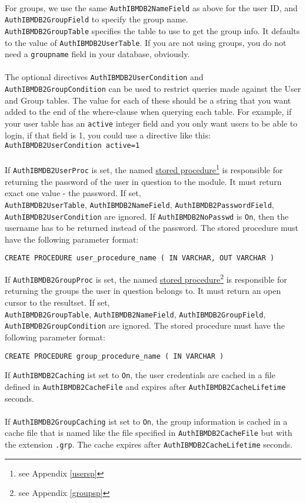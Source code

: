 \documentclass[11pt,a4paper]{article}
\begin{document}
\\
For groups, we use the same {\tt AuthIBMDB2NameField} as above for the user ID, and {\tt AuthIBMDB2GroupField} to specify the group name.\\ {\tt AuthIBMDB2GroupTable} specifies the table to use to get the group info.  It defaults to the value of {\tt AuthIBMDB2UserTable}.  If you are not using groups, you do not need a {\tt groupname} field in your database, obviously.\\
\\
The optional directives {\tt AuthIBMDB2UserCondition} and \\{\tt AuthIBMDB2GroupCondition} can be used to restrict queries made against the User and Group tables. The value for each of these should be a string that you want added to the end of the where-clause when querying each table.
For example, if your user table has an {\tt active} integer field and you only want users to be able to login, if that field is 1, you could use a directive like this:\\
{\tt AuthIBMDB2UserCondition active=1}\\
\\
If {\tt AuthIBMDB2UserProc} is set, the named \hyperlink{husersp}{stored procedure}\footnote{see Appendix \ref{usersp}} is responsible for returning the password of the user in question to the module. It must return exact one value - the password. If set,\\ {\tt AuthIBMDB2UserTable}, {\tt AuthIBMDB2NameField}, {\tt AuthIBMDB2PasswordField}, {\tt AuthIBMDB2UserCondition} are ignored. If {\tt AuthIBMDB2NoPasswd} is {\tt On}, then the username has to be returned instead of the password. The stored procedure must have the following parameter format:
\begin{verbatim}
CREATE PROCEDURE user_procedure_name ( IN VARCHAR, OUT VARCHAR )
\end{verbatim}
\pagebreak
If {\tt AuthIBMDB2GroupProc} is set, the named \hyperlink{hgroupsp}{stored procedure}\footnote{see Appendix \ref{groupsp}} is responsible for returning the groups the user in question belongs to. It must return an open cursor to the resultset. If set,\\ {\tt AuthIBMDB2GroupTable}, {\tt AuthIBMDB2NameField}, {\tt AuthIBMDB2GroupField}, {\tt AuthIBMDB2GroupCondition} are ignored. The stored procedure must have the following parameter format:
\begin{verbatim}
CREATE PROCEDURE group_procedure_name ( IN VARCHAR )
\end{verbatim}
If {\tt AuthIBMDB2Caching} ist set to {\tt On}, the user credentials are cached in a file defined in {\tt AuthIBMDB2CacheFile} and expires after {\tt AuthIBMDB2CacheLifetime} seconds.\\
\\
If {\tt AuthIBMDB2GroupCaching} ist set to {\tt On}, the group information is cached in a cache file that is named like the file specified in {\tt AuthIBMDB2CacheFile} but with the extension {\tt .grp}. The cache expires after {\tt AuthIBMDB2CacheLifetime} seconds.
\end{document}

